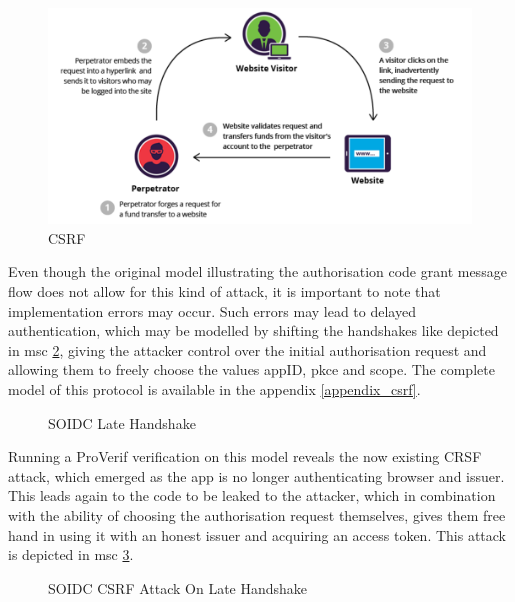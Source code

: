 \documentclass[11pt,twoside,a4paper,openright]{book}
\begin{document}
\begin{figure}[H]
    \centering
    \includegraphics[width=\textwidth]{images/csrf.png}
    \caption{CSRF \cite{csrfImage}}
    \label{fig:csrf}
\end{figure}

Even though the original model illustrating the authorisation code grant message flow does not allow for this kind of attack, it is important to note that implementation errors may occur. Such errors may lead to delayed authentication, which may be modelled by shifting the handshakes like depicted in msc \ref{fig:msc_soidc_lateHS}, giving the attacker control over the initial authorisation request and allowing them to freely choose the values appID, pkce and scope. The complete model of this protocol is available in the appendix \ref{appendix_csrf}.

\begin{figure}[H]
    \centering
    
    \caption{SOIDC Late Handshake}
    \label{fig:msc_soidc_lateHS}
\end{figure}

Running a ProVerif verification on this model reveals the now existing CRSF attack, which emerged as the app is no longer authenticating browser and issuer. This leads again to the code to be leaked to the attacker, which in combination with the ability of choosing the authorisation request themselves, gives them free hand in using it with an honest issuer and acquiring an access token. This attack is depicted in msc \ref{fig:msc_soidc_lateHS_attack}.

\begin{figure}[H]
    \centering
    
    \caption{SOIDC CSRF Attack On Late Handshake}
    \label{fig:msc_soidc_lateHS_attack}
\end{figure}

\end{document}
